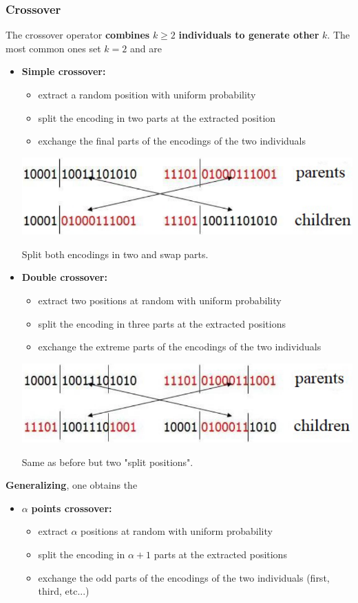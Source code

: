 \documentclass[11pt]{article}
\begin{document}
	\subsubsection{Crossover}
	The crossover operator \textbf{combines} $k \geq 2$ \textbf{individuals to generate other} $k$. The most common ones set $k = 2$ and are
	\begin{itemize}
		\item \textbf{Simple crossover:}
		\begin{itemize}
			\item extract a random position with uniform probability
			\item split the encoding in two parts at the extracted position
			\item exchange the final parts of the encodings of the two individuals
		\end{itemize}
		\begin{center}
			\includegraphics[width=0.65\columnwidth]{img/cross1}
		\end{center}
		Split both encodings in two and swap parts.\\
		
		\item \textbf{Double crossover:}
		\begin{itemize}
			\item extract two positions at random with uniform probability
			\item split the encoding in three parts at the extracted positions
			\item exchange the extreme parts of the encodings of the two individuals
		\end{itemize}
		\begin{center}
			\includegraphics[width=0.65\columnwidth]{img/cross2}
		\end{center}
		Same as before but two "split positions".
	\end{itemize}
	
	\textbf{Generalizing}, one obtains the 
	\begin{itemize}
		\item $\alpha$ \textbf{points crossover:}
		\begin{itemize}
			\item extract $\alpha$ positions at random with uniform probability
			\item split the encoding in $\alpha + 1$ parts at the extracted positions
			\item exchange the odd parts of the encodings of the two individuals (first, third, etc...)
		\end{itemize}
	\end{itemize}
	
\end{document}

